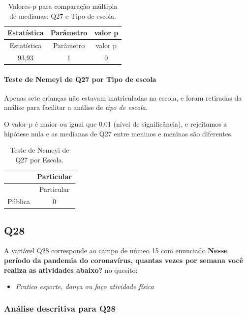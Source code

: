 \documentclass[]{article}
\providecommand{\tightlist}{%
  \setlength{\itemsep}{0pt}\setlength{\parskip}{0pt}}
\let\oldparagraph\paragraph
\renewcommand{\paragraph}[1]{\oldparagraph{#1}\mbox{}}
\begin{document}
\begin{longtable}[]{@{}ccc@{}}
\caption{\label{tab:unnamed-chunk-826}Valores-p para comparação múltipla de medianas: Q27 e Tipo de escola.}\tabularnewline
\toprule
Estatística & Parâmetro & valor p\tabularnewline
\midrule
\endfirsthead
\toprule
Estatística & Parâmetro & valor p\tabularnewline
\midrule
\endhead
93,93 & 1 & 0\tabularnewline
\bottomrule
\end{longtable}

\hypertarget{teste-de-nemeyi-de-q27-por-tipo-de-escola}{%
\paragraph{Teste de Nemeyi de Q27 por Tipo de escola}\label{teste-de-nemeyi-de-q27-por-tipo-de-escola}}

Apenas sete crianças não estavam matriculadas na escola, e foram retiradas da análise para facilitar a análise de \emph{tipo de escola}.

O valor-p é maior ou igual que 0.01 (nível de significância), e rejeitamos a hipótese nula e as medianas de Q27 entre meninos e meninas são diferentes.

\begin{longtable}[]{@{}lc@{}}
\caption{\label{tab:unnamed-chunk-828}Teste de Nemeyi de Q27 por Escola.}\tabularnewline
\toprule
& Particular\tabularnewline
\midrule
\endfirsthead
\toprule
& Particular\tabularnewline
\midrule
\endhead
Pública & 0\tabularnewline
\bottomrule
\end{longtable}

\cleardoublepage

\hypertarget{q28}{%
\subsection{Q28}\label{q28}}

A variável Q28 corresponde ao campo de númeo 15 com enunciado \textbf{Nesse período da pandemia do coronavírus, quantas vezes por semana você realiza as atividades abaixo?} no quesito:

\begin{itemize}
\tightlist
\item
  \emph{Pratico esporte, dança ou faço atividade física}
\end{itemize}

\hypertarget{anuxe1lise-descritiva-para-q28}{%
\subsubsection{Análise descritiva para Q28}\label{anuxe1lise-descritiva-para-q28}}
\end{document}

